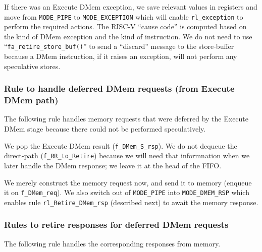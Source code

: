 If there was an Execute DMem exception, we save relevant values in
registers and move from \verb|MODE_PIPE| to \verb|MODE_EXCEPTION|
which will enable \verb|rl_exception| to perform the required actions.
The RISC-V ``cause code'' is computed based on the kind of DMem
exception and the kind of instruction.  We do not need to use
``\verb|fa_retire_store_buf()|'' to send a ``discard'' message to the
store-buffer because a DMem instruction, if it raises an exception,
will not perform any speculative stores.




\subsubsection{Rule to handle deferred DMem requests (from Execute DMem path)}

\label{Sec_Fife_DMem_deferred}

The following rule handles memory requests that were deferred by the
Execute DMem stage because there could not be performed speculatively.


We pop the Execute DMem result (\verb|f_DMem_S_rsp|).  We do not
dequeue the direct-path (\verb|f_RR_to_Retire|) because we will need
that informnation when we later handle the DMem response; we leave it
at the head of the FIFO.

We merely construct the memory request now, and send it to memory
(enqueue it on \verb|f_DMem_req|).  We also switch out of
\verb|MODE_PIPE| into \verb|MODE_DMEM_RSP| which enables rule
\verb|rl_Retire_DMem_rsp| (described next) to await the memory
response.


\subsubsection{Rules to retire responses for deferred DMem requests}

\label{Sec_Fife_Retire_DMem_deferred}

The following rule handles the corresponding responses from memory.

